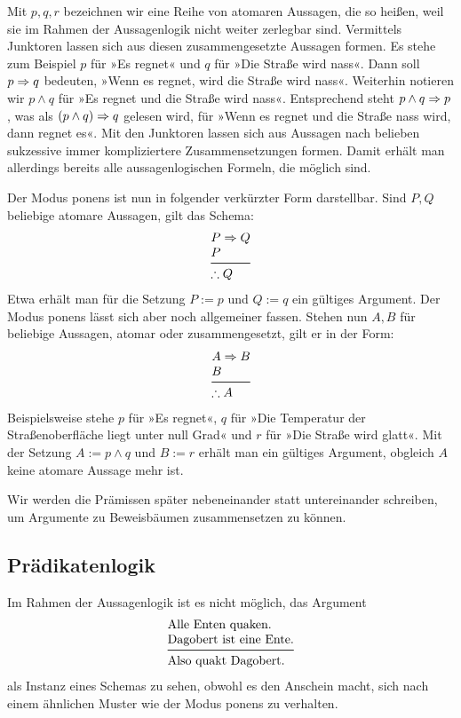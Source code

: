 Mit $p,q,r$ bezeichnen wir eine Reihe von atomaren Aussagen, die so
heißen, weil sie im Rahmen der Aussagenlogik nicht weiter zerlegbar
sind. Vermittels Junktoren lassen sich aus diesen zusammengesetzte
Aussagen formen. Es stehe zum Beispiel $p$ für »Es regnet« und $q$ für
»Die Straße wird nass«. Dann soll $p\Rightarrow q$ bedeuten, »Wenn es regnet,
wird die Straße wird nass«. Weiterhin notieren wir $p\land q$ für
»Es regnet und die Straße wird nass«. Entsprechend steht
$p\land q\Rightarrow p$, was als $(p\land q)\Rightarrow q$ gelesen wird, für
»Wenn es regnet und die Straße nass wird, dann regnet es«.
Mit den Junktoren lassen sich aus Aussagen nach belieben sukzessive
immer kompliziertere Zusammensetzungen formen. Damit erhält man
allerdings bereits alle aussagenlogischen Formeln, die möglich sind.

Der Modus ponens ist nun in folgender verkürzter Form darstellbar.
Sind $P,Q$ beliebige atomare Aussagen, gilt das Schema:
\[\begin{array}{@{}l@{}}
P\cond Q\\
P\\
\midrule[\inferrulewidth]
\therefore Q
\end{array}\]
Etwa erhält man für die Setzung $P:=p$ und $Q:=q$ ein gültiges
Argument. Der Modus ponens lässt sich aber noch allgemeiner fassen.
Stehen nun $A,B$ für beliebige Aussagen, atomar oder zusammengesetzt,
gilt er in der Form:
\[\begin{array}{@{}l@{}}
A\cond B\\
B\\
\midrule[\inferrulewidth]
\therefore A
\end{array}\]
Beispielsweise stehe $p$ für »Es regnet«, $q$ für »Die Temperatur
der Straßenoberfläche liegt unter null Grad« und $r$ für
»Die Straße wird glatt«. Mit der Setzung $A:=p\land q$ und
$B:=r$ erhält man ein gültiges Argument, obgleich $A$ keine atomare
Aussage mehr ist.

Wir werden die Prämissen später nebeneinander statt untereinander
schreiben, um Argumente zu Beweisbäumen zusammensetzen zu
können.

\subsection{Prädikatenlogik}

Im Rahmen der Aussagenlogik ist es nicht möglich, das Argument
\[\begin{array}{@{}l@{}}
\text{Alle Enten quaken.}\\
\text{Dagobert ist eine Ente.}\\
\midrule[\inferrulewidth]
\text{Also quakt Dagobert.}
\end{array}\]
als Instanz eines Schemas zu sehen, obwohl es den Anschein macht,
sich nach einem ähnlichen Muster wie der Modus ponens zu verhalten.

